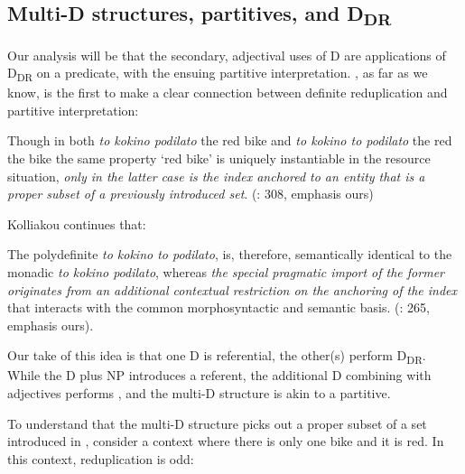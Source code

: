 \documentclass[output=paper,
modfonts
]{langscibook}
\begin{document}
\subsection{Multi-D structures, partitives, and D\textsubscript{DR}}

Our analysis will be that the secondary, adjectival uses of D are applications of D\textsubscript{DR} on a predicate, with the ensuing partitive interpretation. \citet{kolliakou2004}, as far as we know, is the first to make a clear connection between definite reduplication and partitive interpretation: 

\begin{displayquote}
Though in both \textit{to kokino podilato} {\ob}the red bike{\cb} and \textit{to kokino to podilato} {\ob}the red the bike{\cb} the same property `red bike' is uniquely instantiable {\ob}in the resource situation{\cb}, \textit{only in the latter case is the index anchored to an entity that is a proper subset of a previously introduced set}. (\citealt{kolliakou2004}: 308, emphasis ours)
\end{displayquote}

Kolliakou continues that: 

\begin{displayquote}
The polydefinite \textit{to kokino to podilato}, is, therefore, semantically identical to the monadic \textit{to kokino podilato}, whereas \textit{the special pragmatic import of the former originates from an additional contextual restriction on the anchoring of the index} that interacts with the common morphosyntactic and semantic basis. (\citealt{kolliakou2004}: 265, emphasis ours).
\end{displayquote}

Our take of this idea is that one D is referential, the other(s) perform D\textsubscript{DR}. While the D plus NP introduces a referent, the additional D combining with adjectives performs , and the multi-D structure is akin to a partitive.

To understand that the multi-D structure picks out a proper subset of a set introduced in , consider a  context where there is only one bike and it is red. In this context, reduplication is odd: \newpage 

\ea \label{ex:etxeberria:45}  \\
\z
\z 
\end{document}
